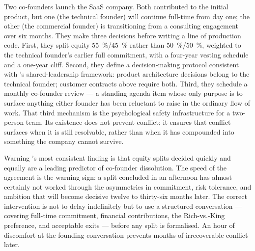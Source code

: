 \begin{example}
Two co-founders launch the SaaS company. Both contributed to the initial product, but one
(the technical founder) will continue full-time from day one; the other (the commercial founder)
is transitioning from a consulting engagement over six months. They make three decisions before
writing a line of production code. First, they split equity \qty{55}{\percent}/\qty{45}{\percent}
rather than \qty{50}{\percent}/\qty{50}{\percent}, weighted to the technical founder's earlier
full commitment, with a four-year vesting schedule and a one-year cliff. Second, they define a
decision-making protocol consistent with \textcite{ensley2006shared}'s shared-leadership
framework: product architecture decisions belong to the technical founder; customer contracts
above  require both. Third, they schedule a monthly co-founder review --- a
standing agenda item whose only purpose is to surface anything either founder has been reluctant
to raise in the ordinary flow of work. That third mechanism is the psychological safety
infrastructure for a two-person team. Its existence does not prevent conflict; it ensures that
conflict surfaces when it is still resolvable, rather than when it has compounded into something
the company cannot survive.
\end{example}

\begin{admonition}{Warning}
\textcite{wasserman2012founders}'s most consistent finding is that equity splits decided quickly
and equally are a leading predictor of co-founder dissolution. The speed of the agreement is the
warning sign: a split concluded in an afternoon has almost certainly not worked through the
asymmetries in commitment, risk tolerance, and ambition that will become decisive twelve to
thirty-six months later. The correct intervention is not to delay indefinitely but to use a
structured conversation --- covering full-time commitment, financial contributions, the
Rich-vs.-King preference, and acceptable exits --- before any split is formalised. An hour of
discomfort at the founding conversation prevents months of irrecoverable conflict later.
\end{admonition}

